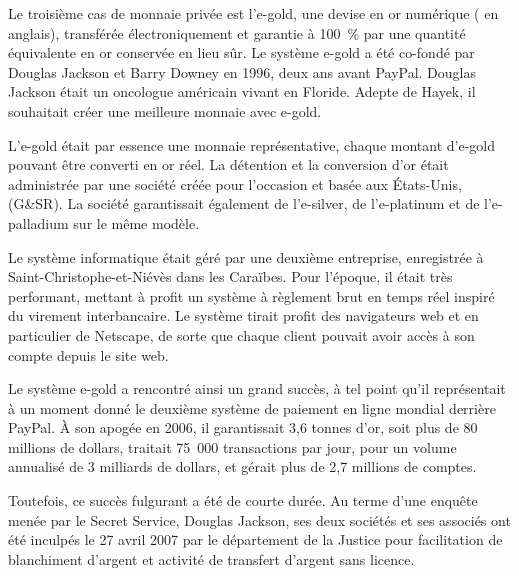 
Le troisième cas de monnaie privée est l'e-gold, une devise en or numérique ( en anglais), transférée électroniquement et garantie à 100~\% par une quantité équivalente en or conservée en lieu sûr. Le système e-gold a été co-fondé par Douglas Jackson et Barry Downey en 1996, deux ans avant PayPal. Douglas Jackson était un oncologue américain vivant en Floride. Adepte de Hayek, il souhaitait créer une meilleure monnaie avec e-gold.


L'e-gold était par essence une monnaie représentative, chaque montant d'e-gold pouvant être converti en or réel. La détention et la conversion d'or était administrée par une société créée pour l'occasion et basée aux États-Unis,  (G\&SR). La société garantissait également de l'e-silver, de l'e-platinum et de l'e-palladium sur le même modèle.

Le système informatique était géré par une deuxième entreprise,  enregistrée à Saint-Christophe-et-Niévès dans les Caraïbes. Pour l'époque, il était très performant, mettant à profit un système à règlement brut en temps réel inspiré du virement interbancaire. Le système tirait profit des navigateurs web et en particulier de Netscape, de sorte que chaque client pouvait avoir accès à son compte depuis le site web.

Le système e-gold a rencontré ainsi un grand succès, à tel point qu'il représentait à un moment donné le deuxième système de paiement en ligne mondial derrière PayPal. À son apogée en 2006, il garantissait 3,6 tonnes d'or, soit plus de 80 millions de dollars, traitait 75~000 transactions par jour, pour un volume annualisé de 3 milliards de dollars, et gérait plus de 2,7 millions de comptes.

Toutefois, ce succès fulgurant a été de courte durée. Au terme d'une enquête menée par le Secret Service, Douglas Jackson, ses deux sociétés et ses associés ont été inculpés le 27 avril 2007 par le département de la Justice pour facilitation de blanchiment d'argent et activité de transfert d'argent sans licence.

